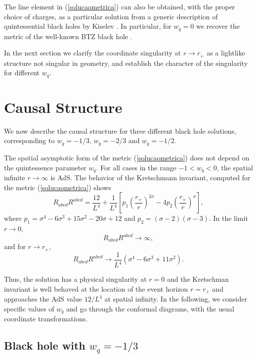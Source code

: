 \documentclass[preprint]{revtex4-1}
\begin{document}
The line element in (\ref{solucaometrica}) can also be obtained, with the proper choice of charges, as a particular solution from a generic description of quintessential black holes by Kiselev \cite{0264-9381-20-6-310}. In particular, for $w_q=0$ we recover the metric of the well-known BTZ black hole \cite{PhysRevLett.69.1849}.

In the next section we clarify the coordinate singularity at $r\rightarrow r_+$ as a lightlike structure not singular in geometry, and establish the character of the singularity for different $w_q$.

\section{Causal Structure}\label{estruturacausal}
We now describe the causal structure for three different black hole solutions, corresponding to $w_q=-1/3$, $w_q=-2/3$ and $w_q=-1/2$. 

The spatial asymptotic form of the metric (\ref{solucaometrica}) does not depend on the quintessence parameter $w_{q}$. For all cases in the range $-1<w_{q}<0$, the spatial infinite $r\rightarrow \infty$ is AdS. The behavior of the  Kretschmann invariant, computed for the metric (\ref{solucaometrica}) shows
\begin{equation}\label{kretsch}
R_{abcd}R^{abcd}=\frac{12}{L^4}+\frac{1}{L^4}\left[p_1\left(\frac{r_{+}}{r}\right)^{2\sigma}-4p_2\left(\frac{r_{+}}{r}\right)^{\sigma}\right],
\end{equation}
 where $p_1=\sigma^{4}-6\sigma^3+15\sigma^2-20\sigma +12$ and $p_2=(\sigma-2)(\sigma-3)$. In the limit $r\rightarrow 0$,
 \[
 R_{abcd}R^{abcd}\rightarrow \infty,
 \]
 and for $r\rightarrow r_{+}$,
 \[
 R_{abcd}R^{abcd}\rightarrow \frac{1}{L^4}\left(\sigma^{4}-6\sigma^{3}+11\sigma^2\right).
 \]

Thus, the solution has a physical singularity at $r=0$ and the Kretschman invariant is well behaved at the location of the event horizon $r=r_{+}$ and approaches the AdS value $12/L^4$ at spatial infinity. In the following, we consider specific values of $w_q$ and go through the conformal diagrams, with the usual coordinate transformations.
 
\subsection{Black hole with $w_{q}=-1/3$} \label{A}
\end{document}
